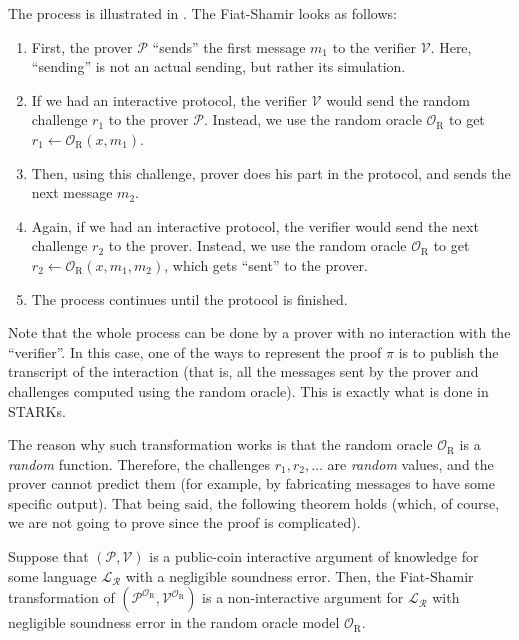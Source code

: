 \documentclass[../lecture-notes-148x210.tex]{subfiles}
\begin{document}
The process is illustrated in . The Fiat-Shamir looks as follows:
\begin{enumerate}
    \item First, the prover $\mathcal{P}$ ``sends'' the first message $m_1$ to the verifier $\mathcal{V}$. Here, ``sending'' is not an actual sending, but rather its simulation.
    \item If we had an interactive protocol, the verifier $\mathcal{V}$ would send the random challenge $r_1$ to the prover $\mathcal{P}$. Instead, we use the random oracle $\mathcal{O}_{\text{R}}$ to get $r_1 \gets \mathcal{O}_{\text{R}}(x,m_1)$.
    \item Then, using this challenge, prover does his part in the protocol, and sends the next message $m_2$. 
    \item Again, if we had an interactive protocol, the verifier would send the next challenge $r_2$ to the prover. Instead, we use the random oracle $\mathcal{O}_{\text{R}}$ to get $r_2 \gets \mathcal{O}_{\text{R}}(x,m_1,m_2)$, which gets ``sent'' to the prover.
    \item The process continues until the protocol is finished.
\end{enumerate}

Note that the whole process can be done by a prover with no interaction with the ``verifier''. In this case, one of the ways to represent the proof $\pi$ is to publish the transcript of the interaction (that is, all the messages sent by the prover and challenges computed using the random oracle). This is exactly what is done in STARKs.

The reason why such transformation works is that the random oracle $\mathcal{O}_{\text{R}}$ is a \textit{random} function. Therefore, the challenges $r_1,r_2,\dots$ are \textit{random} values, and the prover cannot predict them (for example, by fabricating messages to have some specific output). That being said, the following theorem holds (which, of course, we are not going to prove since the proof is complicated).

\begin{theorem}
    Suppose that $(\mathcal{P},\mathcal{V})$ is a public-coin interactive argument of knowledge for some language $\mathcal{L}_{\mathcal{R}}$ with a negligible soundness error. Then, the Fiat-Shamir transformation of $(\mathcal{P}^{\mathcal{O}_{\text{R}}},\mathcal{V}^{\mathcal{O}_{\text{R}}})$ is a non-interactive argument for $\mathcal{L}_{\mathcal{R}}$ with negligible soundness error in the random oracle model $\mathcal{O}_{\text{R}}$.
\end{theorem}
\end{document}
